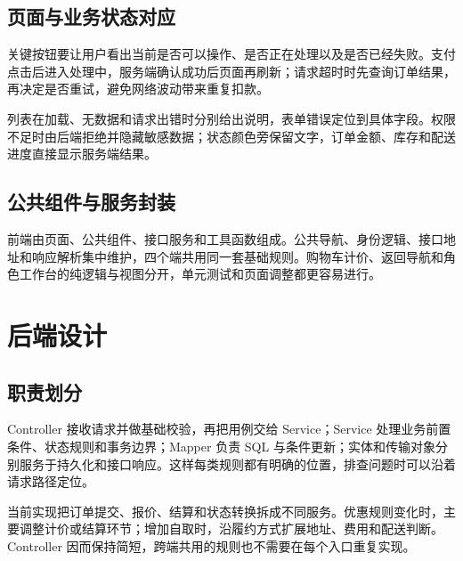 \subsection{页面与业务状态对应}
关键按钮要让用户看出当前是否可以操作、是否正在处理以及是否已经失败。支付点击后进入处理中，服务端确认成功后页面再刷新；请求超时时先查询订单结果，再决定是否重试，避免网络波动带来重复扣款。

列表在加载、无数据和请求出错时分别给出说明，表单错误定位到具体字段。权限不足时由后端拒绝并隐藏敏感数据；状态颜色旁保留文字，订单金额、库存和配送进度直接显示服务端结果。
\subsection{公共组件与服务封装}
前端由页面、公共组件、接口服务和工具函数组成。公共导航、身份逻辑、接口地址和响应解析集中维护，四个端共用同一套基础规则。购物车计价、返回导航和角色工作台的纯逻辑与视图分开，单元测试和页面调整都更容易进行。
\section{后端设计}
\subsection{职责划分}
Controller 接收请求并做基础校验，再把用例交给 Service；Service 处理业务前置条件、状态规则和事务边界；Mapper 负责 SQL 与条件更新；实体和传输对象分别服务于持久化和接口响应。这样每类规则都有明确的位置，排查问题时可以沿着请求路径定位。

当前实现把订单提交、报价、结算和状态转换拆成不同服务。优惠规则变化时，主要调整计价或结算环节；增加自取时，沿履约方式扩展地址、费用和配送判断。Controller 因而保持简短，跨端共用的规则也不需要在每个入口重复实现。
